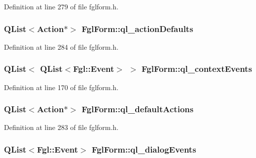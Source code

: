 Definition at line 279 of file fglform.h.

\hypertarget{classFglForm_a6b78dae39bcab3791a9acc99a3b8248d}{
\subsubsection[{ql\_\-actionDefaults}]{\setlength{\rightskip}{0pt plus 5cm}QList$<${\bf Action}$\ast$$>$ {\bf FglForm::ql\_\-actionDefaults}}}
\label{classFglForm_a6b78dae39bcab3791a9acc99a3b8248d}


Definition at line 284 of file fglform.h.

\hypertarget{classFglForm_ac7920cda2f9ebef4076ff19e73cfa047}{
\subsubsection[{ql\_\-contextEvents}]{\setlength{\rightskip}{0pt plus 5cm}QList$<$ QList$<${\bf Fgl::Event}$>$ $>$ {\bf FglForm::ql\_\-contextEvents}}}
\label{classFglForm_ac7920cda2f9ebef4076ff19e73cfa047}


Definition at line 170 of file fglform.h.

\hypertarget{classFglForm_acc7f6b6c7b13cf1e6e39bfdeba18ddc1}{
\subsubsection[{ql\_\-defaultActions}]{\setlength{\rightskip}{0pt plus 5cm}QList$<${\bf Action}$\ast$$>$ {\bf FglForm::ql\_\-defaultActions}}}
\label{classFglForm_acc7f6b6c7b13cf1e6e39bfdeba18ddc1}


Definition at line 283 of file fglform.h.

\hypertarget{classFglForm_a764e11f62e1849d568cda143fa11583e}{
\subsubsection[{ql\_\-dialogEvents}]{\setlength{\rightskip}{0pt plus 5cm}QList$<${\bf Fgl::Event}$>$ {\bf FglForm::ql\_\-dialogEvents}}}
\label{classFglForm_a764e11f62e1849d568cda143fa11583e}



